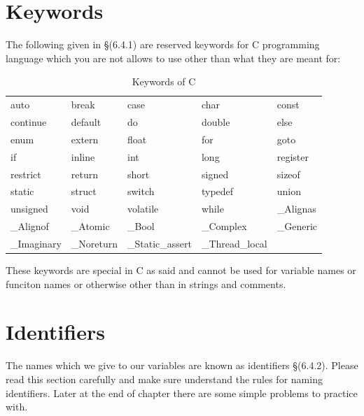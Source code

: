 \section{Keywords}
The following given in \S(6.4.1) are reserved keywords for C programming language which you are not 
allows to use other than what they are meant for:
\begin{table}[H]
 \begin{center}
  \caption{Keywords of C}
  \begin{tabular}{l l l l l}
    auto & break & case & char & const\\
    continue & default & do & double & else\\
    enum & extern & float & for & goto\\
    if & inline & int & long & register\\
    restrict & return & short & signed & sizeof\\
    static & struct & switch & typedef  & union\\
    unsigned & void & volatile & while & \_Alignas\\
    \_Alignof& \_Atomic & \_Bool & \_Complex & \_Generic \\
    \_Imaginary & \_Noreturn & \_Static\_assert & \_Thread\_local\\
  \end{tabular}
 \end{center}
\end{table}

These keywords are special in C as said and cannot be used for variable names 
or funciton names or otherwise other than in strings and comments.

\section{Identifiers}
The names which we give to our variables are known as identifiers
\S(6.4.2). Please read this section carefully and make sure understand
the rules for naming identifiers. Later at the end of chapter there are some
simple problems to practice with.

